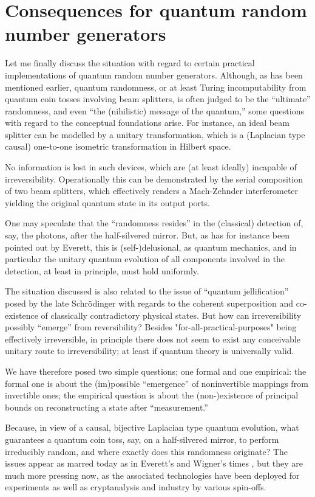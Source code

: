 \documentclass[%
  preprint,
 showpacs,
 showkeys,
 preprintnumbers,
 amsmath,amssymb,
 aps,
   pra,
  longbibliography,
 ]{revtex4-1}
\begin{document}
\section{Consequences for quantum random number generators}

Let me finally discuss the situation with regard to certain practical implementations of quantum random number generators.
Although, as has been mentioned earlier,
quantum randomness, or at least Turing incomputability from quantum coin tosses involving beam splitters,
is often judged to be the ``ultimate'' randomness,
and even ``the (nihilistic) message of the quantum,''
some questions with regard to the conceptual foundations arise.
For instance, an ideal beam splitter can be modelled by a unitary transformation,
which is a (Laplacian type causal) one-to-one isometric transformation in Hilbert space.

No information is lost in such devices, which are (at least ideally) incapable of irreversibility.
Operationally this can be demonstrated by the serial composition of two beam splitters,
which effectively renders a Mach-Zehnder interferometer yielding the original quantum state in its output ports.

One may speculate that the ``randomness resides'' in the (classical) detection of,
say, the photons, after the half-silvered mirror.
But, as has for instance been pointed out by Everett, this is (self-)delusional,
as quantum mechanics,
and in particular the unitary quantum evolution of all components involved in the detection,
at least in principle,
must hold uniformly.

The  situation discussed is also related to the issue of  ``quantum jellification''
posed by the late Schr\"odinger with regards to the coherent superposition
and co-existence of classically contradictory physical states.
But how can irreversibility possibly ``emerge'' from reversibility?
Besides "for-all-practical-purposes" being effectively irreversible,
in principle there does not seem to exist any conceivable unitary route to irreversibility;
at least if quantum theory is universally valid.

We have therefore posed two simple questions; one formal and one empirical:
the formal one is about the (im)possible ``emergence'' of noninvertible mappings from invertible ones;
the empirical question is about the (non-)existence of principal bounds on reconstructing a state after ``measurement.''

Because, in view of a causal, bijective Laplacian type quantum evolution, what guarantees a quantum coin toss, say,
on a half-silvered mirror, to perform irreducibly random,
and where exactly does this randomness originate?
The issues appear as marred today as in Everett's and Wigner's times \cite{wigner:mb},
but they are much more pressing now, as the associated technologies \cite{zeilinger:qct,stefanov-2000}
have been deployed for experiments \cite{wjswz-98}
as well as cryptanalysis and industry by various spin-offs.
\end{document}
